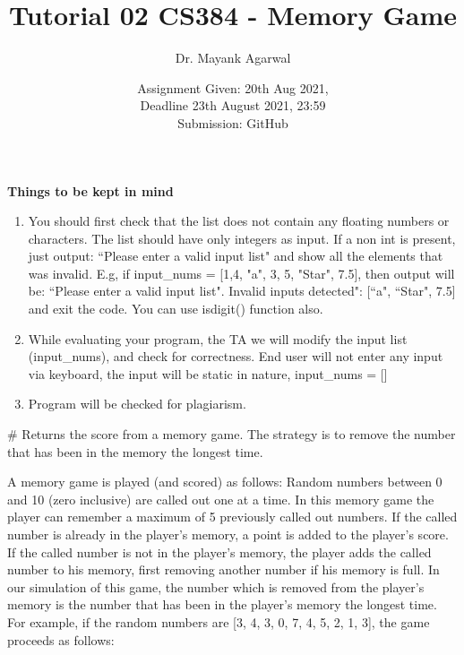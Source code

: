 \documentclass[12pt,  letterpaper,  twoside]{article}
\title{Tutorial 02 CS384 -  Memory Game}
\author{Dr. Mayank Agarwal}
\date{Assignment Given: 20th Aug 2021,\\ Deadline 23th August 2021,  
23:59\\Submission: GitHub }
\begin{document}
	\maketitle  
	\textbf{Things to be kept in mind}\\
	\begin{enumerate}
		\item You should first check that the list does not contain any 
		floating numbers  or characters. The list should have only integers as 
		input. If 
		a non int is present, just output: ``Please enter a valid input list" 
		and show all the elements that was invalid. E.g, 
		if input\_nums = [1,4, "a", 3, 5, "Star", 7.5], then output will be:
		``Please enter a valid input list". Invalid inputs detected": [``a", 
		``Star", 7.5] and exit the code. You can use  
		isdigit() 
		function also. 
		
		\item While evaluating your program, the TA we will modify the input 
		list (input\_nums), and 
		check for 
		correctness. End user will not enter any input via keyboard, the input 
		will be 
		static in nature, input\_nums = []
		\item Program will be checked for plagiarism.  
	\end{enumerate}
	
	
	\# Returns the score from a memory game.  The strategy is to remove the 
	number that has
	 been in the memory the longest time.  
	
	A memory game is played (and scored) as follows: Random numbers between 0 
	and 10 (zero inclusive) are called out one at a time. In this memory game 
	the player can remember a maximum of 5 previously called out numbers. If 
	the called number is already in the player's memory, a point is added to 
	the player's score. If the called number is not in the player's memory, the 
	player adds the called number to his memory, first removing another number 
	if his memory is full. In our simulation of this game, the number which is 
	removed from the player's memory is the number that has been in the 
	player's memory the longest time. For example, if the random numbers are 
	[3, 4, 3, 0, 7, 4, 5, 2, 1, 3], the game proceeds as follows:
	
\end{document}
